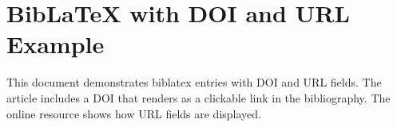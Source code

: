 \documentclass[11pt]{article}
\begin{document}
\section*{BibLaTeX with DOI and URL Example}

This document demonstrates biblatex entries with DOI and URL fields.
The article \textcite{doiexample2020} includes a DOI that renders as a
clickable link in the bibliography. The online resource \parencite{urlexample}
shows how URL fields are displayed.

\printbibliography
\end{document}
